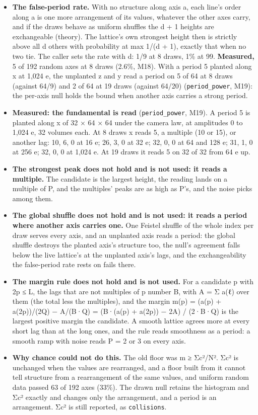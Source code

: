 \begin{itemize}
\item \textbf{The false-period rate.} With no structure along axis a, each line's order along a is one more arrangement of its values, whatever the other axes carry, and if the draws behave as uniform shuffles the d + 1 heights are exchangeable (theory). The lattice's own strongest height then is strictly above all d others with probability at max 1/(d + 1), exactly that when no two tie. The caller sets the rate with d: 1/9 at 8 draws, 1\% at 99. \textbf{Measured,} 5 of 192 random axes at 8 draws (2.6\%, M18). With a period 5 planted along x at 1,024 e, the unplanted z and y read a period on 5 of 64 at 8 draws (against 64/9) and 2 of 64 at 19 draws (against 64/20) (\texttt{period\_\allowbreak{}power}, M19): the per-axis null holds the bound when another axis carries a strong period.
\item \textbf{Measured: the fundamental is read} (\texttt{period\_\allowbreak{}power}, M19). A period 5 is planted along x of 32 × 64 × 64 under the camera law, at amplitudes 0 to 1,024 e, 32 volumes each. At 8 draws x reads 5, a multiple (10 or 15), or another lag: 10, 6, 0 at 16 e; 26, 3, 0 at 32 e; 32, 0, 0 at 64 and 128 e; 31, 1, 0 at 256 e; 32, 0, 0 at 1,024 e. At 19 draws it reads 5 on 32 of 32 from 64 e up.
\item \textbf{The strongest peak does not hold and is not used: it reads a multiple.} The candidate is the largest height, the reading lands on a multiple of P, and the multiples' peaks are as high as P's, and the noise picks among them.
\item \textbf{The global shuffle does not hold and is not used: it reads a period where another axis carries one.} One Feistel shuffle of the whole index per draw serves every axis, and an unplanted axis reads a period: the global shuffle destroys the planted axis's structure too, the null's agreement falls below the live lattice's at the unplanted axis's lags, and the exchangeability the false-period rate rests on fails there.
\item \textbf{The margin rule does not hold and is not used.} For a candidate p with 2p ≤ L, the lags that are not multiples of p number B, with A = Σ a(ℓ) over them (the total less the multiples), and the margin m(p) = (a(p) + a(2p))/(2Q) − A/(B·Q) = (B·(a(p) + a(2p)) − 2A) / (2·B·Q) is the largest positive margin the candidate. A smooth lattice agrees more at every short lag than at the long ones, and the rule reads smoothness as a period: a smooth ramp with noise reads P = 2 or 3 on every axis.
\item \textbf{Why chance could not do this.} The old floor was m ≥ Σc²/N². Σc² is unchanged when the values are rearranged, and a floor built from it cannot tell structure from a rearrangement of the same values, and uniform random data passed 63 of 192 axes (33\%). The drawn null retains the histogram and Σc² exactly and changes only the arrangement, and a period is an arrangement. Σc² is still reported, as \texttt{collisions}.

\end{itemize}
